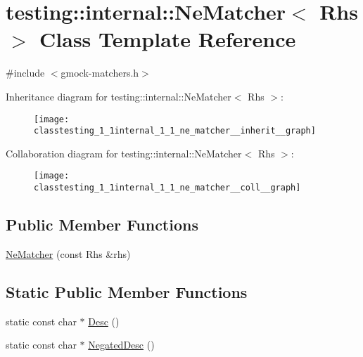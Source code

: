 \hypertarget{classtesting_1_1internal_1_1_ne_matcher}{}\section{testing\+:\+:internal\+:\+:Ne\+Matcher$<$ Rhs $>$ Class Template Reference}
\label{classtesting_1_1internal_1_1_ne_matcher}


{\ttfamily \#include $<$gmock-\/matchers.\+h$>$}



Inheritance diagram for testing\+:\+:internal\+:\+:Ne\+Matcher$<$ Rhs $>$\+:
\nopagebreak
\begin{figure}[H]
\begin{center}
\leavevmode
\texttt{[image: classtesting\_1\_1internal\_1\_1\_ne\_matcher\_\_inherit\_\_graph]}
\end{center}
\end{figure}


Collaboration diagram for testing\+:\+:internal\+:\+:Ne\+Matcher$<$ Rhs $>$\+:
\nopagebreak
\begin{figure}[H]
\begin{center}
\leavevmode
\texttt{[image: classtesting\_1\_1internal\_1\_1\_ne\_matcher\_\_coll\_\_graph]}
\end{center}
\end{figure}
\subsection*{Public Member Functions}
\begin{DoxyCompactItemize}
\item 
\hyperlink{classtesting_1_1internal_1_1_ne_matcher_a64842882811cc96624c87119c51edd3e}{Ne\+Matcher} (const Rhs \&rhs)
\end{DoxyCompactItemize}
\subsection*{Static Public Member Functions}
\begin{DoxyCompactItemize}
\item 
static const char $\ast$ \hyperlink{classtesting_1_1internal_1_1_ne_matcher_a2ec33febe5471f9d435b4dc9f5cda564}{Desc} ()
\item 
static const char $\ast$ \hyperlink{classtesting_1_1internal_1_1_ne_matcher_a9ea152391b69d422ba2a88c3d2d2dae5}{Negated\+Desc} ()
\end{DoxyCompactItemize}


